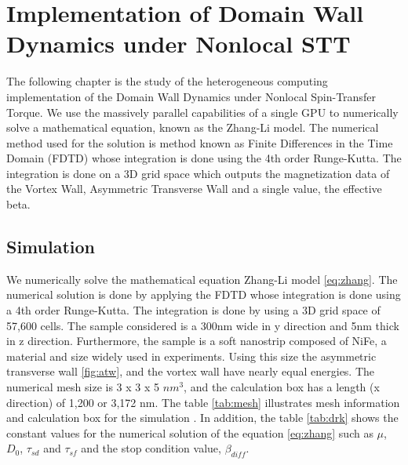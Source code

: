 
\chapter{Implementation of Domain Wall Dynamics under Nonlocal STT} %

\label{Implementation of Domain Wall Dynamics under Nonlocal STT} %


The following chapter is the study of the heterogeneous computing implementation of the Domain Wall Dynamics under Nonlocal Spin-Transfer Torque. We use the massively parallel capabilities of a single GPU to numerically solve a mathematical equation, known as the Zhang-Li model. The numerical method used for the solution is method known as Finite Differences in the Time Domain (FDTD) whose integration is done using the 4th order Runge-Kutta. The integration is done on a 3D grid space which outputs the magnetization data of the Vortex Wall, Asymmetric Transverse Wall and a single value, the effective beta.

\section{Simulation}

We numerically solve the mathematical equation Zhang-Li model \ref{eq:zhang}. The numerical solution is done by applying the FDTD whose integration is done using a 4th order Runge-Kutta. The integration is done by using a 3D grid space of 57,600 cells. The sample considered is a 300nm wide in y direction and 5nm thick in z direction. Furthermore, the sample is a soft nanostrip composed of NiFe, a material and size widely used in experiments. Using this size the asymmetric transverse wall \ref{fig:atw}, and the vortex wall have nearly equal energies. The numerical mesh size is 3 x 3 x 5 $nm^3$, and the calculation box has a length (x direction) of 1,200 or 3,172 nm. The table \ref{tab:mesh} illustrates mesh information and calculation box for the simulation \cite{claudio}. In addition, the table \ref{tab:drk} shows the constant values for the numerical solution of the equation \ref{eq:zhang} such as $\mu$, $D_{0}$, $\tau_{sd}$ and $\tau_{sf}$ and the stop condition value, $\beta_{diff}$.

